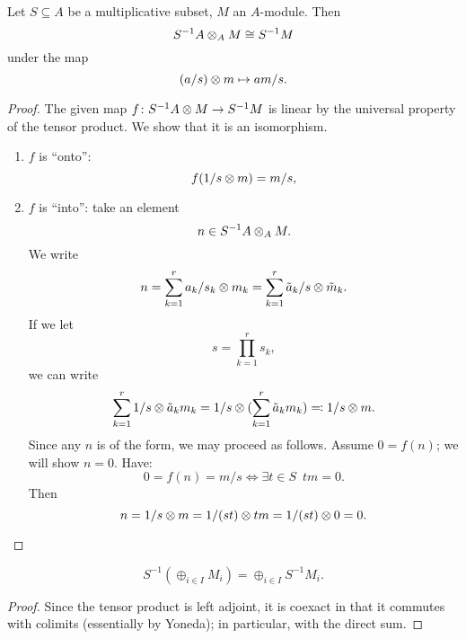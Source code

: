 \begin{lemma}
  Let $S \subseteq A$ be a multiplicative subset, $M$ an $A$-module. Then
  \[ S^{-1}A \otimes_A M \cong S^{-1}M\]
  under the map
  \[ (a / {s}) \otimes m \mapsto am /{s}.\]
\end{lemma}
\begin{proof}
  The given map
  \( f \colon S^{-1}A \otimes M \to S^{-1} M\)
  is linear by the universal property of the tensor product. We show that it is an isomorphism.
  \begin{enumerate}
  \item $f$ is ``onto'':
    \[ f(1/{s} \otimes m) = m /{s},\]
  \item $f$ is ``into'': take an element
    \[ n \in S^{-1}A \otimes_A M.\]
    We write
    \[ n = \sum_{k=1}^r a_k/{s_k} \otimes m_k = \sum_{k=1}^r \tilde{a}_k / {s} \otimes \tilde{m}_k.\]
    If we let
    \[s = \prod_{k=1}^r s_k,\]
    we can write
    \[ \sum_{k=1}^r 1 /{s} \otimes \tilde{a}_k m_k = 1 /{s} \otimes (\sum_{k=1}^r \tilde{a}_k m_k) \eqqcolon 1 / {s} \otimes m.\]
    Since any $n$ is of the form, we may proceed as follows. Assume
    $0 = f(n)$;
    we will show
    $n = 0$.
    Have:
    \[ 0 = f(n) = m /{s} \iff \exists t \in S \enspace tm = 0.\]
    Then
    \[ n = 1/ {s} \otimes m = 1 / {(st)} \otimes tm = 1 /{(st)} \otimes 0 = 0.\]
  \end{enumerate}
\end{proof}

\begin{corollary}
  \[S^{-1}( \oplus_{i \in I} M_i) = \oplus_{i \in I} S^{-1} M_i.\]
\end{corollary}
\begin{proof}
  Since the tensor product is left adjoint, it is coexact in that it commutes with colimits (essentially by Yoneda); in particular, with the direct sum.
\end{proof}


